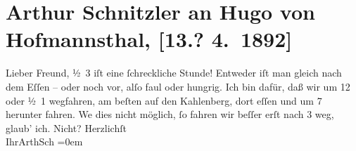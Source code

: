 

               \section[Arthur Schnitzler an Hugo von Hofmannsthal, {[}13.? 4. 1892{]}]{ Arthur Schnitzler an Hugo von Hofmannsthal, {[}13.? 4. 1892{]}}\nopagebreak{}\rehead{ }\begin{ledgroupsized}[t]{13cm}\normalsize\beginnumbering{} \toendnotes[C]{\smallbreak\pagebreak[2]} 
\pstart{}{\pb}Lieber Freund,\pend\pstart
           ½ 3 iſt eine ſchreckliche Stunde! Entweder iſt man gleich nach dem
                    Eſſen – oder noch vor, alſo faul oder hungrig. Ich bin dafür, daß wir um
                        12 oder ½ 1 wegfahren, am beſten auf den
                        Kahlenberg, {\pb}dort eſſen und um 7 herunter
                    fahren. We{\geminationn} dies nicht möglich, ſo fahren wir
                    beſſer erſt nach 3 weg, glaub’ ich. Nicht?\pend
           \pstart
           Herzlichſt{\\[\baselineskip]}Ihr\spacefill\mbox{ArthSch}\pend
           \leftskip=0em{}\endnumbering{}\end{ledgroupsized}  \newcommand{\dateiname}{L00094}\newcommand{\titel}{Arthur Schnitzler an Hugo von Hofmannsthal, [13.? 4. 1892]}\newcommand{\editorInnen}{Martin Anton Müller und Gerd-Hermann Susen}
      